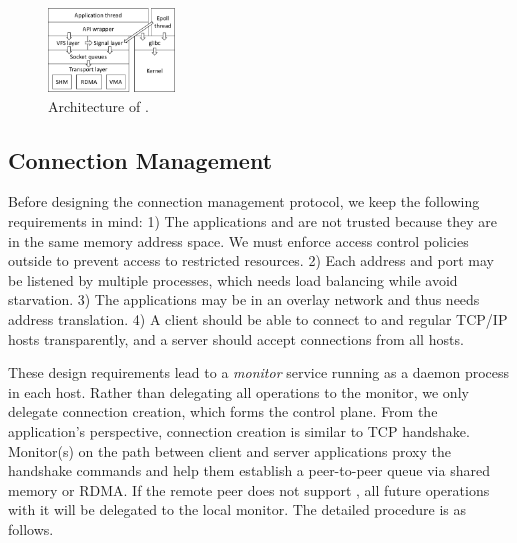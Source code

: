 

\begin{figure}[t!]
	\centering
	\includegraphics[width=0.3\textwidth]{images/libsd_architecture}
	\vspace{-5pt}
	\caption{Architecture of \libipc{}.}
	\label{fig:libsd-architecture}
\end{figure}


\subsection{Connection Management}
\label{subsec:connection-management}

Before designing the connection management protocol, we keep the following requirements in mind:
1) The applications and \libipc{} are not trusted because they are in the same memory address space. We must enforce access control policies outside \libipc{} to prevent access to restricted resources.
2) Each address and port may be listened by multiple processes, which needs load balancing while avoid starvation.
3) The applications may be in an overlay network and thus needs address translation. 
4) A client should be able to connect to \sys{} and regular TCP/IP hosts transparently, and a server should accept connections from all hosts.

These design requirements lead to a \emph{monitor} service running as a daemon process in each host.
Rather than delegating all operations to the monitor, we only delegate connection creation, which forms the control plane.
From the application's perspective, connection creation is similar to TCP handshake.
Monitor(s) on the path between client and server applications proxy the handshake commands and help them establish a peer-to-peer queue via shared memory or RDMA.
If the remote peer does not support \sys{}, all future operations with it will be delegated to the local monitor.
The detailed procedure is as follows.


